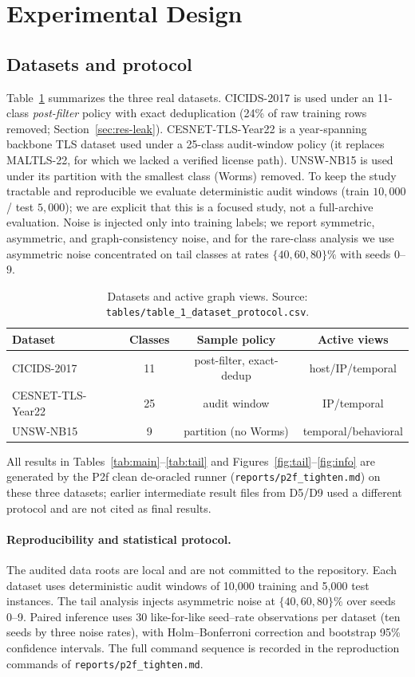 \documentclass[preprint,3p,times]{elsarticle}
\begin{document}
\section{Experimental Design}
\label{sec:exp}
\subsection{Datasets and protocol}
Table~\ref{tab:data} summarizes the three real datasets. CICIDS-2017 is used under
an 11-class \emph{post-filter} policy with exact deduplication (24\% of raw
training rows removed; Section~\ref{sec:res-leak}). CESNET-TLS-Year22 is a
year-spanning backbone TLS dataset used under a 25-class audit-window policy (it
replaces MALTLS-22, for which we lacked a verified license path). UNSW-NB15 is
used under its partition with the smallest class (Worms) removed. To keep the
study tractable and reproducible we evaluate deterministic audit windows
(train $10{,}000$ / test $5{,}000$); we are explicit that this is a focused study,
not a full-archive evaluation. Noise is injected only into training labels; we
report symmetric, asymmetric, and graph-consistency noise, and for the rare-class
analysis we use asymmetric noise concentrated on tail classes at rates
$\{40,60,80\}\%$ with seeds $0$--$9$.

\begin{table}[t]
\centering
\caption{Datasets and active graph views. Source: \texttt{tables/table\_1\_dataset\_protocol.csv}.}
\label{tab:data}
\small
\begin{tabular}{lccc}
\toprule
Dataset & Classes & Sample policy & Active views \\
\midrule
CICIDS-2017 & 11 & post-filter, exact-dedup & host/IP/temporal \\
CESNET-TLS-Year22 & 25 & audit window & IP/temporal \\
UNSW-NB15 & 9 & partition (no Worms) & temporal/behavioral \\
\bottomrule
\end{tabular}
\end{table}

All results in Tables~\ref{tab:main}--\ref{tab:tail} and Figures~\ref{fig:tail}--\ref{fig:info}
are generated by the P2f clean de-oracled runner
(\texttt{reports/p2f\_tighten.md}) on these three datasets; earlier intermediate
result files from D5/D9 used a different protocol and are not cited as final
results.

\paragraph{Reproducibility and statistical protocol.}
The audited data roots are local and are not committed to the repository. Each
dataset uses deterministic audit windows of 10,000 training and 5,000 test
instances. The tail analysis injects asymmetric noise at $\{40,60,80\}\%$ over
seeds 0--9. Paired inference uses 30 like-for-like seed--rate observations per
dataset (ten seeds by three noise rates), with Holm--Bonferroni correction and
bootstrap 95\% confidence intervals. The full command sequence is recorded in
the reproduction commands of \texttt{reports/p2f\_tighten.md}.
\end{document}
